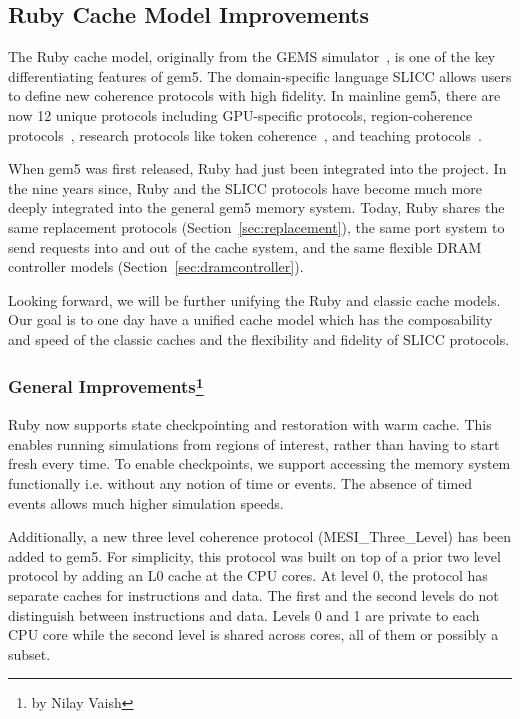\subsection[Ruby Cache Model Improvements]{Ruby Cache Model Improvements}
\label{sec:ruby}

The Ruby cache model, originally from the GEMS simulator~\cite{MartinSBMXAMHW05}, is one of the key differentiating features of gem5.
The domain-specific language SLICC allows users to define new coherence protocols with high fidelity.
In mainline gem5, there are now 12 unique protocols including GPU-specific protocols, region-coherence protocols~\cite{PowerBasu2013-hsc}, research protocols like token coherence~\cite{MartinHill2003-tokenCoh}, and teaching protocols~\cite{NagarajanSorin2020-cohMCMPrimer}.

When gem5 was first released, Ruby had just been integrated into the project.
In the nine years since, Ruby and the SLICC protocols have become much more deeply integrated into the general gem5 memory system.
Today, Ruby shares the same replacement protocols (Section~\ref{sec:replacement}), the same port system to send requests into and out of the cache system, and the same flexible DRAM controller models (Section~\ref{sec:dramcontroller}).

Looking forward, we will be further unifying the Ruby and classic cache models.
Our goal is to one day have a unified cache model which has the composability and speed of the classic caches and the flexibility and fidelity of SLICC protocols.

\subsubsection[General Improvements]{General Improvements\footnote{by Nilay Vaish}}

Ruby now supports state checkpointing and restoration with warm cache.
This enables running simulations from regions of interest, rather than having to start fresh every time.
To enable checkpoints, we support accessing the memory system functionally i.e. without any notion of time or events.
The absence of timed events allows much higher simulation speeds.

Additionally, a new three level coherence protocol (MESI\_Three\_Level) has been added to gem5.
For simplicity, this protocol was built on top of a prior two level protocol by adding an L0 cache at the CPU cores.
At level 0, the protocol has separate caches for instructions and data.
The first and the second levels do not distinguish between instructions and data.
Levels 0 and 1 are private to each CPU core while the second level is shared across cores, all of them or possibly a subset.

